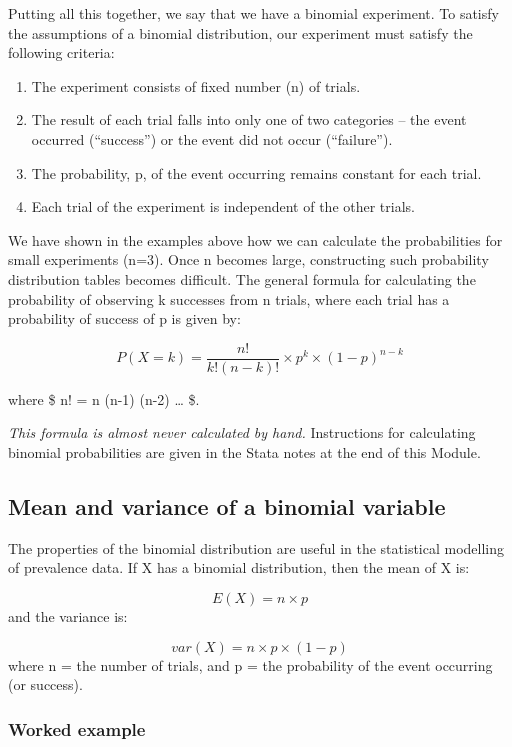 \documentclass[
]{memoir}
\providecommand{\tightlist}{%
  \setlength{\itemsep}{0pt}\setlength{\parskip}{0pt}}
\begin{document}
Putting all this together, we say that we have a binomial experiment. To satisfy the assumptions of a binomial distribution, our experiment must satisfy the following criteria:

\begin{enumerate}
\def\labelenumi{\arabic{enumi}.}
\tightlist
\item
  The experiment consists of fixed number (n) of trials.
\item
  The result of each trial falls into only one of two categories -- the event occurred (``success'') or the event did not occur (``failure'').
\item
  The probability, p, of the event occurring remains constant for each trial.
\item
  Each trial of the experiment is independent of the other trials.
\end{enumerate}

We have shown in the examples above how we can calculate the probabilities for small experiments (n=3). Once n becomes large, constructing such probability distribution tables becomes difficult. The general formula for calculating the probability of observing k successes from n trials, where each trial has a probability of success of p is given by:

\[ P(X=k) = \frac{n!}{k! (n-k)!} \times p^k \times (1-p)^{n-k} \]

where \$ n! = n \times (n-1) \times (n-2) \times \dots {} \$.

\emph{This formula is almost never calculated by hand.} Instructions for calculating binomial probabilities are given in the Stata notes at the end of this Module.

\hypertarget{mean-and-variance-of-a-binomial-variable}{%
\subsection{Mean and variance of a binomial variable}\label{mean-and-variance-of-a-binomial-variable}}

The properties of the binomial distribution are useful in the statistical modelling of prevalence data. If X has a binomial distribution, then the mean of X is:

\[ E(X) = n \times p\]
and the variance is:

\[ var(X) = n \times p \times (1-p) \]
where n = the number of trials, and p = the probability of the event occurring (or success).

\hypertarget{worked-example-2}{%
\subsubsection{Worked example}\label{worked-example-2}}
\end{document}
